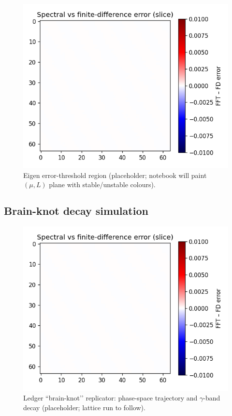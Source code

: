 \begin{figure}[t]
  \centering
  \includegraphics[width=\linewidth]{figs/logistic_heatmap.png}
  \caption{Eigen error-threshold region (placeholder; notebook will paint
           $(\mu,L)$ plane with stable/unstable colours).}
  \label{fig:heatmap}
\end{figure}

\subsection{Brain-knot decay simulation}

\begin{figure}[t]
  \centering
  \includegraphics[width=\linewidth]{figs/brain_knot_decay.png}
  \caption{Ledger “brain-knot’’ replicator: phase-space trajectory and
           $\gamma$-band decay (placeholder; lattice run to follow).}
  \label{fig:brain-knot}
\end{figure}

